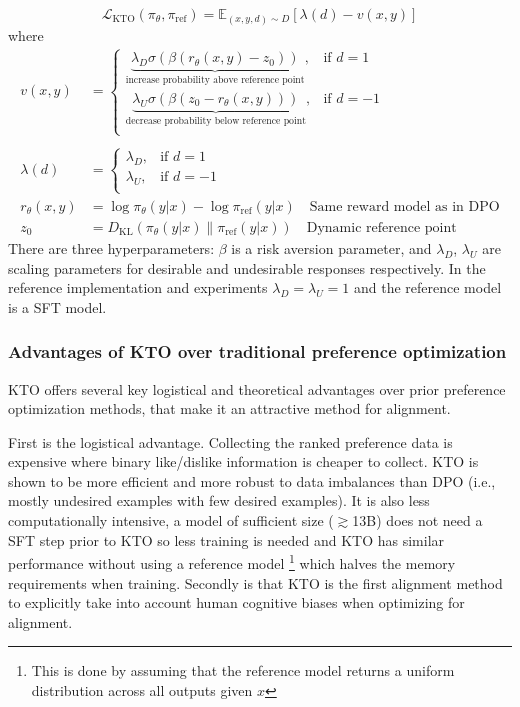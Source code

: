 \begin{equation*}
\mathcal{L}_{\mathrm{KTO}}(\pi_\theta, \pi_{\text{ref}}) = \mathbb{E}_{(x, y, d) \sim D} \left[ \lambda(d) - v(x,y)\right]
\end{equation*}
\noindent where
\begin{equation*}
\begin{aligned}
v(x,y) &=\begin{cases}
\underbrace{\lambda_D \sigma(\beta(r_\theta(x,y)-z_0))}_\text{increase probability above reference point}, & \text{if } d = 1 \\
\underbrace{\lambda_U \sigma(\beta(z_0 - r_\theta(x,y)))}_\text{decrease probability below reference point}, & \text{if } d = -1 \\
\end{cases} \\
\\
\lambda(d) &=
\begin{cases}
\lambda_D, & \text{if } d = 1 \\
\lambda_U, & \text{if } d = -1 \\
\end{cases}
\\
r_\theta(x,y) &= \log \pi_\theta(y|x) - \log \pi_{\text{ref}}(y|x) \quad \text{Same reward model as in DPO}\\
z_0 &= D_\text{KL} \left( \pi_\theta(y|x) \| \pi_{\text{ref}}(y|x)\right) \quad \text{Dynamic reference point}
\end{aligned}
\end{equation*}
There are three hyperparameters: $\beta$ is a risk aversion parameter, and $\lambda_D$, $\lambda_U$ are scaling parameters for desirable and undesirable responses respectively. In the reference implementation and experiments $\lambda_D = \lambda_U = 1$ and the reference model is a SFT model.

\subsubsection{Advantages of KTO over traditional preference optimization}

KTO offers several key logistical and theoretical advantages over prior preference optimization methods, that make it an attractive method for alignment. 

First is the logistical advantage. Collecting the ranked preference data is expensive \cite{casperOpenProblemsFundamental2023} where binary like/dislike information is cheaper to collect. KTO is shown to be more efficient and more robust to data imbalances than DPO (i.e., mostly undesired examples with few desired examples). It is also less computationally intensive, a model of sufficient size ($\gtrsim$13B) does not need a SFT step prior to KTO so less training is needed and KTO has similar performance without using a reference model \footnote{This is done by assuming that the reference model returns a uniform distribution across all outputs given $x$} which halves the memory requirements when training. Secondly is that KTO is the first alignment method to explicitly take into account human cognitive biases when optimizing for alignment.

